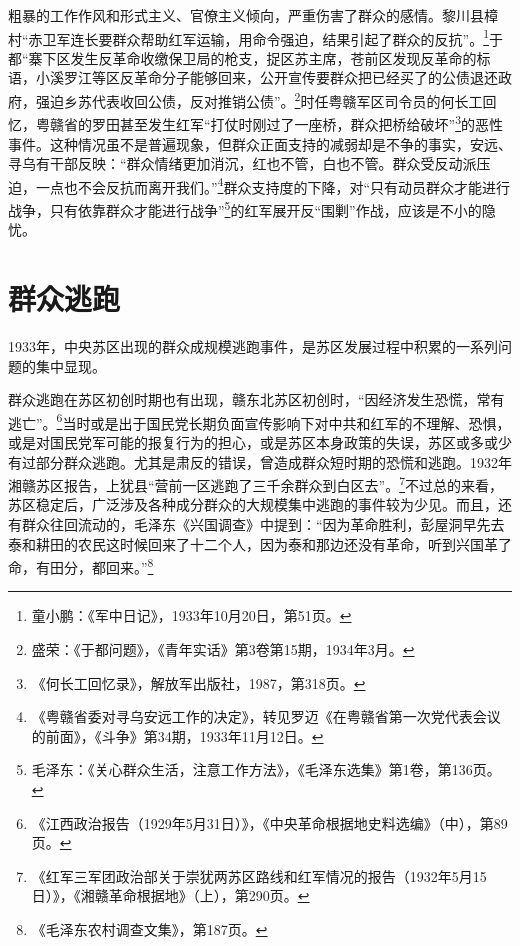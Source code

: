 粗暴的工作作风和形式主义、官僚主义倾向，严重伤害了群众的感情。黎川县樟村“赤卫军连长要群众帮助红军运输，用命令强迫，结果引起了群众的反抗”。\footnote{童小鹏：《军中日记》，1933年10月20日，第51页。}于都“寨下区发生反革命收缴保卫局的枪支，捉区苏主席，苍前区发现反革命的标语，小溪罗江等区反革命分子能够回来，公开宣传要群众把已经买了的公债退还政府，强迫乡苏代表收回公债，反对推销公债”。\footnote{盛荣：《于都问题》，《青年实话》第3卷第15期，1934年3月。}时任粤赣军区司令员的何长工回忆，粤赣省的罗田甚至发生红军“打仗时刚过了一座桥，群众把桥给破坏”\footnote{《何长工回忆录》，解放军出版社，1987，第318页。}的恶性事件。这种情况虽不是普遍现象，但群众正面支持的减弱却是不争的事实，安远、寻乌有干部反映：“群众情绪更加消沉，红也不管，白也不管。群众受反动派压迫，一点也不会反抗而离开我们。”\footnote{《粤赣省委对寻乌安远工作的决定》，转见罗迈《在粤赣省第一次党代表会议的前面》，《斗争》第34期，1933年11月12日。}群众支持度的下降，对“只有动员群众才能进行战争，只有依靠群众才能进行战争”\footnote{毛泽东：《关心群众生活，注意工作方法》，《毛泽东选集》第1卷，第136页。}的红军展开反“围剿”作战，应该是不小的隐忧。

\section{群众逃跑}


1933年，中央苏区出现的群众成规模逃跑事件，是苏区发展过程中积累的一系列问题的集中显现。


群众逃跑在苏区初创时期也有出现，赣东北苏区初创时，“因经济发生恐慌，常有逃亡”。\footnote{《江西政治报告（1929年5月31日）》，《中央革命根据地史料选编》（中），第89页。}当时或是出于国民党长期负面宣传影响下对中共和红军的不理解、恐惧，或是对国民党军可能的报复行为的担心，或是苏区本身政策的失误，苏区或多或少有过部分群众逃跑。尤其是肃反的错误，曾造成群众短时期的恐慌和逃跑。1932年湘赣苏区报告，上犹县“营前一区逃跑了三千余群众到白区去”。\footnote{《红军三军团政治部关于崇犹两苏区路线和红军情况的报告（1932年5月15日）》，《湘赣革命根据地》（上），第290页。}不过总的来看，苏区稳定后，广泛涉及各种成分群众的大规模集中逃跑的事件较为少见。而且，还有群众往回流动的，毛泽东《兴国调查》中提到：“因为革命胜利，彭屋洞早先去泰和耕田的农民这时候回来了十二个人，因为泰和那边还没有革命，听到兴国革了命，有田分，都回来。”\footnote{《毛泽东农村调查文集》，第187页。}



